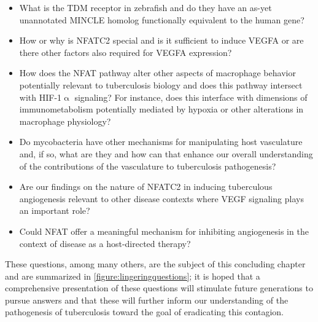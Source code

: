 \begin{itemize}
\item What is the TDM receptor in zebrafish and do they have an as\hyp{}yet unannotated MINCLE homolog functionally equivalent to the human gene? 
\item How or why is NFATC2 special and is it sufficient to induce VEGFA or are there other factors also required for VEGFA expression? 
\item How does the NFAT pathway alter other aspects of macrophage behavior potentially relevant to tuberculosis biology and does this pathway intersect with HIF\hyp{}1$\upalpha$ signaling? For instance, does this interface with dimensions of immunometabolism potentially mediated by hypoxia or other alterations in macrophage physiology?
\item Do mycobacteria have other mechanisms for manipulating host vasculature and, if so, what are they and how can that enhance our overall understanding of the contributions of the vasculature to tuberculosis pathogenesis? 
\item Are our findings on the nature of NFATC2 in inducing tuberculous angiogenesis relevant to other disease contexts where VEGF signaling plays an important role? 
\item Could NFAT offer a meaningful mechanism for inhibiting angiogenesis in the context of disease as a host\hyp{}directed therapy?
\end{itemize}

These questions, among many others, are the subject of this concluding chapter and are summarized in \autoref{figure:lingeringquestions}; it is hoped that a comprehensive presentation of these questions will stimulate future generations to pursue answers and that these will further inform our understanding of the pathogenesis of tuberculosis toward the goal of eradicating this contagion.

